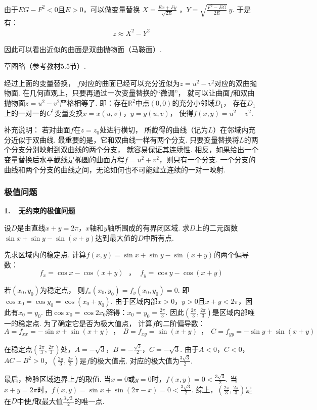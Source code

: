 \begin{solution}
由于$EG-F^2 < 0$且$E>0$，可以做变量替换
$X = \frac{Ex + Fy}{\sqrt{2E}}$
，$Y = \sqrt{\frac{F^2-EG}{2E}}~ y$.
于是有：
\begin{equation}
    \begin{aligned}
        z \approx X^2 - Y^2
        \nonumber
    \end{aligned}
\end{equation}

因此可以看出近似的曲面是双曲抛物面（马鞍面）.

草图略（参考教材5.5节）.

经过上面的变量替换，
$f$对应的曲面已经可以充分近似为$z = u^2 - v^2$对应的双曲抛物面.
在几何直观上，只要再通过一次变量替换的“微调”，
就可以让曲面$f$和双曲抛物面$z = u^2 - v^2$严格相等了.
即：存在$\mathbb{R}^2$中点$(0,0)$的充分小邻域$D_1$，
存在$D_1$上的一对一的$C^1$变量变换$x = x(u,v)$，$y = y(u,v)$，
使得$f(x,y) = u^2 - v^2 $.

补充说明：
若对曲面$f$在$z=z_0$处进行横切，
所截得的曲线（记为$L$）在邻域内充分近似于双曲线.
最重要的是，它和双曲线一样有两个分支.
只要变量替换将$L$的两个分支分别映射到双曲线的两个分支，
就容易保证其连续性.
相反，如果给出一个变量替换后水平截线是椭圆的曲面方程$f = u^2 + v^2$，则只有一个分支.
一个分支的曲线和两个分支的曲线之间，无论如何也不可能建立连续的一对一映射.
\end{solution}

\subsubsection{极值问题}
\textbf{1.~~无约束的极值问题}

\begin{example}[2023]
\label{ex:ch06-23}
设$D$是由直线$x+y = 2\pi$，$x$轴和$y$轴所围成的有界闭区域.
求$D$上的二元函数$\sin x + \sin y - \sin (x+y)$达到最大值的$D$中所有点.
\end{example}

\begin{solution}
先求区域内的稳定点. 计算$f(x,y) = \sin x + \sin y - \sin (x+y)$的两个偏导数：
$$
f_x = \cos x - \cos (x+y)~~~，~~~f_y = \cos y - \cos (x+y)
$$

若$(x_0,y_0)$为稳定点，
则$f_x(x_0,y_0) = f_y(x_0,y_0) = 0$.
即$\cos x_0 = \cos y_0 = \cos (x_0 + y_0)$.
由于区域内部$x>0$，$y>0$且$x+y < 2\pi$，因此有$x_0 = y_0$.
由$\cos x_0 = \cos 2x_0$解得：$x_0 = y_0 = \frac{2\pi}{3}$.
因此$\left( \frac{2\pi}{3},\frac{2\pi}{3} \right)$是区域内部唯一的稳定点. 为了确定它是否为极大值点，
计算$f$的二阶偏导数：
$$
A = f_{xx} = -\sin x + \sin (x+y)~~，~~
B = f_{xy} = \sin (x+y)~~，~~
C = f_{yy} = -\sin y + \sin (x+y)
$$

在稳定点$\left( \frac{2\pi}{3},\frac{2\pi}{3} \right)$处，$A = -\sqrt{3}$，$B = -\frac{\sqrt{3}}{2}$，$C = -\sqrt{3}$.
由于$A<0$，$C<0$，$AC-B^2 > 0$，$\left( \frac{2\pi}{3},\frac{2\pi}{3} \right)$是$f$的极大值点.
对应的极大值为$\frac{3\sqrt{3}}{2}$.\par
最后，检验区域边界上$f$的取值.
当$x=0$或$y=0$时，$f(x,y) = 0 < \frac{3\sqrt{3}}{2}$.
当$x+y=2\pi$时，$f(x,y) = \sin x + \sin (2\pi - x) = 0< \frac{3\sqrt{3}}{2}$.
综上，$\left( \frac{2\pi}{3},\frac{2\pi}{3} \right)$是在$D$中使$f$取最大值$\frac{3\sqrt{3}}{2}$的唯一点.
\end{solution}


